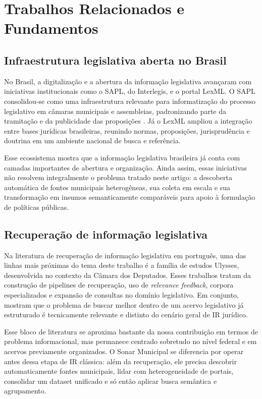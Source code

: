 \section{Trabalhos Relacionados e Fundamentos}

\subsection{Infraestrutura legislativa aberta no Brasil}

No Brasil, a digitalização e a abertura da informação legislativa avançaram com iniciativas institucionais como o SAPL, do Interlegis, e o portal LexML. O SAPL consolidou-se como uma infraestrutura relevante para informatização do processo legislativo em câmaras municipais e assembleias, padronizando parte da tramitação e da publicidade das proposições \cite{interlegis_sapl,interlegis_sapl_repo}. Já o LexML ampliou a integração entre bases jurídicas brasileiras, reunindo normas, proposições, jurisprudência e doutrina em um ambiente nacional de busca e referência.

Esse ecossistema mostra que a informação legislativa brasileira já conta com camadas importantes de abertura e organização. Ainda assim, essas iniciativas não resolvem integralmente o problema tratado neste artigo: a descoberta automática de fontes municipais heterogêneas, sua coleta em escala e sua transformação em insumos semanticamente comparáveis para apoio à formulação de políticas públicas.

\subsection{Recuperação de informação legislativa}

Na literatura de recuperação de informação legislativa em português, uma das linhas mais próximas do tema deste trabalho é a família de estudos Ulysses, desenvolvida no contexto da Câmara dos Deputados. Esses trabalhos tratam da construção de pipelines de recuperação, uso de \textit{relevance feedback}, corpora especializados e expansão de consultas no domínio legislativo. Em conjunto, mostram que o problema de buscar melhor dentro de um acervo legislativo já estruturado é tecnicamente relevante e distinto do cenário geral de IR jurídico.

Esse bloco de literatura se aproxima bastante da nossa contribuição em termos de problema informacional, mas permanece centrado sobretudo no nível federal e em acervos previamente organizados. O Sonar Municipal se diferencia por operar antes dessa etapa de IR clássica: além da recuperação, ele precisa descobrir automaticamente fontes municipais, lidar com heterogeneidade de portais, consolidar um dataset unificado e só então aplicar busca semântica e agrupamento.

